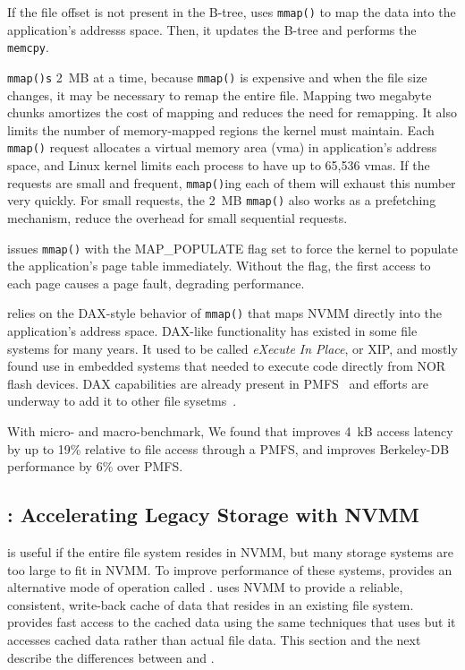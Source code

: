 If the file offset is not present in the B-tree, \DAChell{} uses
\texttt{mmap()} to map the data into the application's addresss space. Then,
it updates the B-tree and performs the \texttt{memcpy}.

\DAChell{} \texttt{mmap()s} 2~MB at a time, because \texttt{mmap()} is expensive
and when the file size changes, it may be necessary to remap the entire file. 
Mapping two megabyte chunks amortizes the cost of mapping and reduces the need
for remapping.  It also limits the number of memory-mapped regions the kernel
must maintain. Each \texttt{mmap()} request allocates a
virtual memory area (vma) in application's address space, and Linux kernel
limits each process to have up to 65,536 vmas. If the requests are small and
frequent, \texttt{mmap()}ing each of them will exhaust this number very quickly.
For small requests, the 2~MB \texttt{mmap()} also works as a prefetching
mechanism, reduce the overhead for small sequential requests.

\DAChell{} issues \texttt{mmap()} with the MAP\_POPULATE flag set to force the kernel to
populate the application's page table immediately.  Without the flag, the first
access to each page causes a page fault, degrading performance.

\DAChell{} relies on the DAX-style behavior of \texttt{mmap()} that maps NVMM
directly into the application's address space.  DAX-like functionality has
existed in some file systems for many years.  It used to be called
\emph{eXecute In Place}, or XIP, and mostly found use in embedded systems that
needed to execute
code directly from NOR flash devices.  DAX capabilities are already present in
PMFS~\cite{PMFS} and efforts are underway to add it to other file sysetms~\cite{ext4dax}.

With micro- and macro-benchmark, We found that \DAChell{} improves 4~kB access
latency by up to 19\% relative to file access through a PMFS, and improves
Berkeley-DB performance by 6\% over PMFS.

\subsection{\CChell{}: Accelerating Legacy Storage with NVMM}
\label{sec:overview}

\DAChell{} is useful if the entire file system resides in NVMM, but many
storage systems are too large to fit in NVMM.  To improve
performance of these systems, \Chell{} provides an alternative mode of
operation called \CChell{}.  \CChell{} uses NVMM to provide a reliable,
consistent, write-back cache of data that resides in an existing file system.
\CChell{} provides fast access to the cached data using the same techniques
that \DAChell{} uses but it accesses cached data rather than actual file data.
This section and the next describe the differences between \CChell{}
and \DAChell{}.

